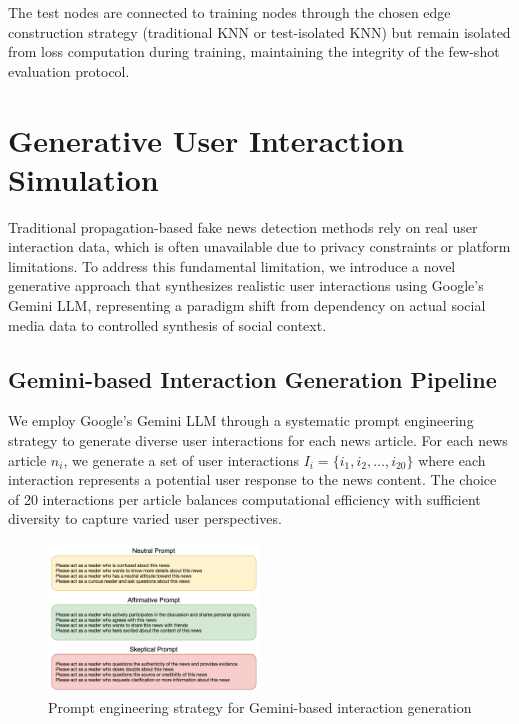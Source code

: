 The test nodes are connected to training nodes through the chosen edge construction strategy (traditional KNN or test-isolated KNN) but remain isolated from loss computation during training, maintaining the integrity of the few-shot evaluation protocol.

\section{Generative User Interaction Simulation}

Traditional propagation-based fake news detection methods rely on real user interaction data, which is often unavailable due to privacy constraints or platform limitations. To address this fundamental limitation, we introduce a novel generative approach that synthesizes realistic user interactions using Google's Gemini LLM, representing a paradigm shift from dependency on actual social media data to controlled synthesis of social context.

\subsection{Gemini-based Interaction Generation Pipeline}

We employ Google's Gemini LLM through a systematic prompt engineering strategy to generate diverse user interactions for each news article. For each news article $n_i$, we generate a set of user interactions $I_i = \{i_1, i_2, \ldots, i_{20}\}$ where each interaction represents a potential user response to the news content. The choice of 20 interactions per article balances computational efficiency with sufficient diversity to capture varied user perspectives.

\begin{figure}[h]
    \centering
    \includegraphics[width=0.5\textwidth]{context/methodology/fig/prompt.png}
    \caption{Prompt engineering strategy for Gemini-based interaction generation}
    \label{fig:prompt}
\end{figure}

